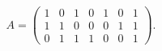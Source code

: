 \begin{equation}
A=\left( 
\begin{array}{ccccccc}
1 & 0 & 1 & 0 & 1 & 0 & 1 \\ 
1 & 1 & 0 & 0 & 0 & 1 & 1 \\ 
0 & 1 & 1 & 1 & 0 & 0 & 1
\end{array}
\right) .  \label{14}
\end{equation}

